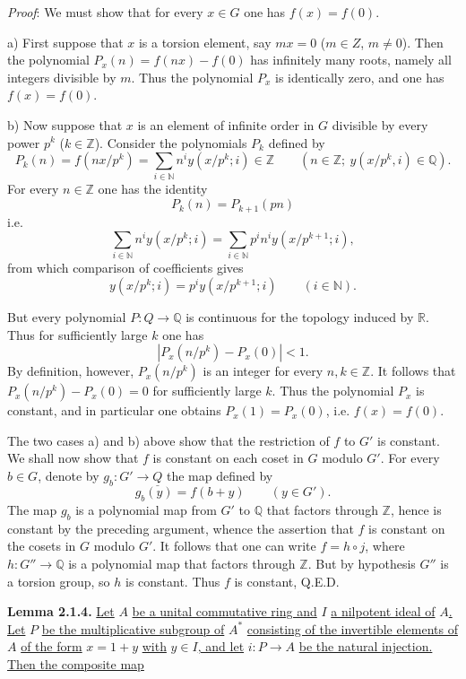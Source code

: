 \emph{Proof}: We must show that for every $x\in G$ one has $f(x)=f(0)$.

a) First suppose that $x$ is a torsion element, say $mx=0$ ($m\in Z$, $m\ne0$). Then the polynomial $P_x(n)=f(nx)-f(0)$ has infinitely many roots, namely all integers divisible by $m$. Thus the polynomial $P_x$ is identically zero, and one has $f(x)=f(0)$.

b) Now suppose that $x$ is an element of infinite order in $G$ divisible by every power $p^k$ ($k\in\mathbb Z$). Consider the polynomials $P_k$ defined by
\[
P_k(n)=f(nx/p^k)=\sum_{i\in\mathbb N}n^iy(x/p^k;i)\in\mathbb Z
\qquad(n\in\mathbb Z;\ y(x/p^k,i)\in\mathbb Q).
\]
For every $n\in\mathbb Z$ one has the identity
\[
P_k(n)=P_{k+1}(pn)
\]
i.e.
\[
\sum_{i\in\mathbb N}n^iy(x/p^k;i)=\sum_{i\in\mathbb N}p^in^iy(x/p^{k+1};i),
\]
from which comparison of coefficients gives
\[
y(x/p^k;i)=p^iy(x/p^{k+1};i)\qquad(i\in\mathbb N).
\]


%

But every polynomial $P:Q\to\mathbb Q$ is continuous for the topology induced by $\mathbb R$. Thus for sufficiently large $k$ one has
\[
|P_x(n/p^k)-P_x(0)|<1.
\]
By definition, however, $P_x(n/p^k)$ is an integer for every $n,k\in\mathbb Z$. It follows that $P_x(n/p^k)-P_x(0)=0$ for sufficiently large $k$. Thus the polynomial $P_x$ is constant, and in particular one obtains $P_x(1)=P_x(0)$, i.e. $f(x)=f(0)$.

The two cases a) and b) above show that the restriction of $f$ to $G'$ is constant. We shall now show that $f$ is constant on each coset in $G$ modulo $G'$. For every $b\in G$, denote by $g_b:G'\to\underline{Q}$ the map defined by
\[
g_b(y)=f(b+y)\qquad(y\in G').
\]
The map $g_b$ is a polynomial map from $G'$ to $\mathbb Q$ that factors through $\mathbb Z$, hence is constant by the preceding argument, whence the assertion that $f$ is constant on the cosets in $G$ modulo $G'$. It follows that one can write $f=h\circ j$, where $h:G''\to\mathbb Q$ is a polynomial map that factors through $\mathbb Z$. But by hypothesis $G''$ is a torsion group, so $h$ is constant. Thus $f$ is constant, Q.E.D.

\textbf{Lemma 2.1.4.} \uline{Let} $A$ \uline{be a unital commutative ring and} $I$ \uline{a nilpotent ideal of} $A$\uline{. Let} $P$ \uline{be the multiplicative subgroup of} $A^*$ \uline{consisting of the invertible elements of} $A$ \uline{of the form} $x=1+y$ \uline{with} $y\in I$\uline{, and let} $i:P\to A$ \uline{be the natural injection. Then the composite map}

